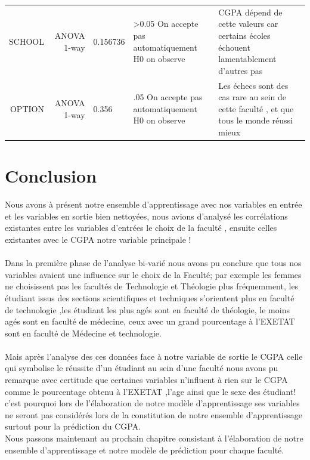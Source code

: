 \begin{table}
{{\begin{tabularx}{\textwidth}{RRHJW}
					SCHOOL & ANOVA 1-way &0.156736& >0.05 On accepte pas automatiquement H0 on observe  & CGPA dépend de cette valeurs car certains écoles échouent lamentablement d'autres pas\\
					 
					OPTION &ANOVA 1-way &0.356&  .05 On accepte pas automatiquement H0 on observe& Les échecs sont des cas rare au sein de cette faculté , et que tous le monde réussi mieux \\
					 
					\bottomrule
		\end{tabularx}}}
		\endgroup
	\end{table}
\newpage 
\section{Conclusion}
Nous avons à présent notre ensemble d'apprentissage avec nos variables en entrée et les variables en sortie bien nettoyées, nous avions d'analysé 
les corrélations existantes entre les variables d'entrées le choix de la faculté , ensuite celles existantes avec le CGPA notre variable principale !
\paragraph{}
Dans la première phase de l'analyse bi-varié nous avons pu conclure que tous nos variables avaient une influence  sur le choix de la Faculté;
par exemple les femmes ne choisissent pas les facultés de Technologie et Théologie plus fréquemment, les étudiant issus des sections scientifiques et techniques s'orientent plus en faculté de technologie ,les étudiant les plus agés sont en faculté de théologie, le moins agés sont en faculté de médecine, ceux avec un grand pourcentage à l'\ac{EXETAT} sont en faculté de Médecine et technologie.
\paragraph{}
Mais après l'analyse des ces données face à notre variable de sortie le CGPA celle qui symbolise le réussite d'un étudiant au sein d'une faculté nous avons pu remarque avec certitude que certaines variables n'influent à rien sur le CGPA comme le pourcentage obtenu à l'\ac{EXETAT}  ,l'age ainsi que le sexe des étudiant!
c'est pourquoi lors de l'élaboration de  notre modèle d'apprentissage ses variables ne seront pas considérés lors de la constitution de notre ensemble d'apprentissage surtout pour la prédiction du CGPA. \\
Nous passons maintenant au prochain chapitre consistant à l'élaboration de notre ensemble d'apprentissage et notre modèle de prédiction  pour chaque faculté.